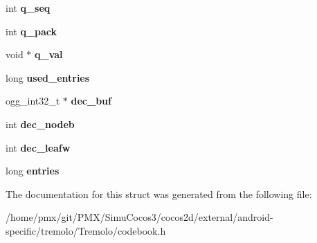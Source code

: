 \begin{DoxyCompactItemize}
\item 
\mbox{\label{structcodebook_afad44ec894e4c7e4c0ce8b8416365b8f}} 
int {\bfseries q\+\_\+seq}
\item 
\mbox{\label{structcodebook_ac2e01c123dae157aecf51f24715e3d0d}} 
int {\bfseries q\+\_\+pack}
\item 
\mbox{\label{structcodebook_aae5c4f5fe50184da628d47b640f56472}} 
void $\ast$ {\bfseries q\+\_\+val}
\item 
\mbox{\label{structcodebook_a4ab1a61278a77046c0a213b7ddfe748c}} 
long {\bfseries used\+\_\+entries}
\item 
\mbox{\label{structcodebook_a74e19dc3ec74be91b72946e49eb0c96f}} 
ogg\+\_\+int32\+\_\+t $\ast$ {\bfseries dec\+\_\+buf}
\item 
\mbox{\label{structcodebook_aa2d53f35ce42378a7fe6a0bd31cd808a}} 
int {\bfseries dec\+\_\+nodeb}
\item 
\mbox{\label{structcodebook_a7d9cb62b506e26a8b07f2d867e7ede71}} 
int {\bfseries dec\+\_\+leafw}
\item 
\mbox{\label{structcodebook_ad025d4a6ebb7417a99870380bfbd1a66}} 
long {\bfseries entries}
\end{DoxyCompactItemize}


The documentation for this struct was generated from the following file\+:\begin{DoxyCompactItemize}
\item 
/home/pmx/git/\+P\+M\+X/\+Simu\+Cocos3/cocos2d/external/android-\/specific/tremolo/\+Tremolo/codebook.\+h\end{DoxyCompactItemize}
